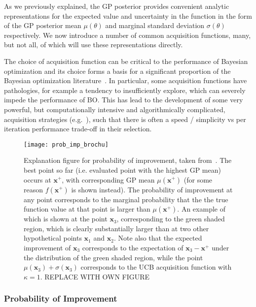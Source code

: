 As we previously explained, the GP posterior provides convenient analytic representations
for the expected value and uncertainty in the function in the form of the GP posterior mean 
$\mu (\theta)$ and marginal standard deviation $\sigma (\theta)$ respectively.  We now
introduce a number of common acquisition functions, many, but not all, of which will use
these representations directly.

The choice of acquisition function can be critical to the performance of Bayesian optimization
and its choice forms a basis for a significant proportion of the Bayesian optimization
literature~\cite{shahriari2016taking}.  In particular, some acquisition functions have
pathologies, for example a tendency to insufficiently explore, which can severely impede the
performance of BO.  This has lead to the development of some very powerful, but computationally
intensive and algorithmically complicated, acquisition strategies (e.g.~\cite{hernandez2014predictive}), 
such that there is often a speed / simplicity vs per iteration performance trade-off in their selection.

\begin{figure}[t]
	\centering
	\texttt{[image: prob\_imp\_brochu]}
	\caption{Explanation figure for probability of improvement, taken from~\cite{brochu2010tutorial}.
		The best point so far (i.e. evaluated point with the highest GP mean) occurs at $\mathbf{x}^+$,
		with corresponding GP mean $\mu(\mathbf{x}^+)$ (for some reason $f(\mathbf{x}^+)$ is shown
		instead).  The probability of improvement at any point corresponds to the marginal probability that the 
		the true function value at that point is larger than $\mu(\mathbf{x}^+)$.  An example of which is 
		shown at the point $\mathbf{x}_3$, corresponding to the green shaded region, which is clearly
		substantially larger than at two other hypothetical points $\mathbf{x}_1$ and $\mathbf{x}_2$.
		Note also that the expected improvement of $\mathbf{x}_3$ corresponds to the expectation 
		of $\mathbf{x}_3-\mathbf{x}^+$ under the distribution of the green shaded region, while the 
		point $\mu(\mathbf{x}_3)+\sigma(\mathbf{x}_3)$ corresponds to the UCB acquisition function
		with $\kappa=1$.
		REPLACE WITH OWN FIGURE\label{fig:opt:prob-imp}}
\end{figure}

\subsubsection{Probability of Improvement}
\label{sec:opt:BO:acq:prob}

